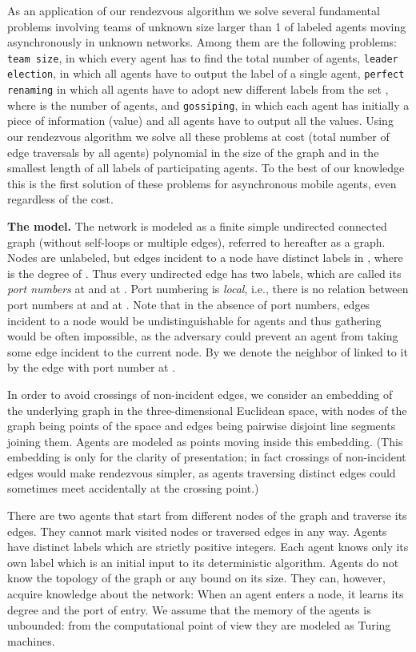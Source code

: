 \documentclass [11pt] {article}
\begin{document}
As an application of our rendezvous algorithm we solve several fundamental problems involving teams of unknown size larger than 1 of labeled agents
moving asynchronously in unknown networks. Among them are the following problems: {\tt team size}, in which every agent has to find the total
number of agents, {\tt leader election}, in which all agents have to output the label of a single agent, {\tt perfect renaming} in which all agents
have to adopt new different labels from the set , where  is the number of agents, and {\tt gossiping}, in which each agent has initially a piece of information (value) and all agents have to output all the values. Using our rendezvous algorithm we solve all these problems at cost
(total number of edge traversals by all agents) polynomial in the size of the graph and in the smallest length of all labels of participating agents.
To the best of our knowledge this is the first solution of these problems for asynchronous mobile agents, even regardless of the cost.

 




\noindent
{\bf The model.}
The network is modeled as a finite simple undirected connected graph (without self-loops or multiple edges), referred to hereafter as a graph. 
Nodes are unlabeled, but
edges incident to a node  have distinct labels in 
, where  is the degree of . Thus every undirected
edge  has two labels, which are called its {\em port numbers} at 
and at . Port numbering is {\em local}, i.e., there is no relation between
port numbers at  and at . Note that in the absence of port numbers, edges incident to a node
would be undistinguishable for agents and thus gathering would be often impossible, 
as the adversary could prevent an agent from taking some edge incident to the current node. 
{By  we denote the neighbor of  linked to it by the edge with port number  at .}

In order to avoid crossings of non-incident edges, we consider an embedding of the underlying graph in the
three-dimensional Euclidean space, with nodes of the graph being points of the
space and edges being
pairwise disjoint line segments joining them.
 Agents are modeled
as points moving inside this embedding. (This embedding is only for the clarity of presentation; in fact crossings of non-incident edges
would make rendezvous simpler, as agents traversing distinct edges could sometimes meet accidentally at the crossing point.)


There are two agents that start from different nodes of the graph  and  traverse its edges.
They cannot mark visited nodes or traversed edges in any way.
Agents have distinct labels which are strictly positive integers. Each agent knows only its own label which is an initial input
to its deterministic algorithm.
Agents do not  know the topology of the graph or any bound on its size. They can, however, acquire knowledge about the network:
When an agent enters a node, it learns its degree and the port of entry. We assume that the memory of the agents is unbounded: from the computational point of view they are modeled as 
Turing machines. 
\end{document}
